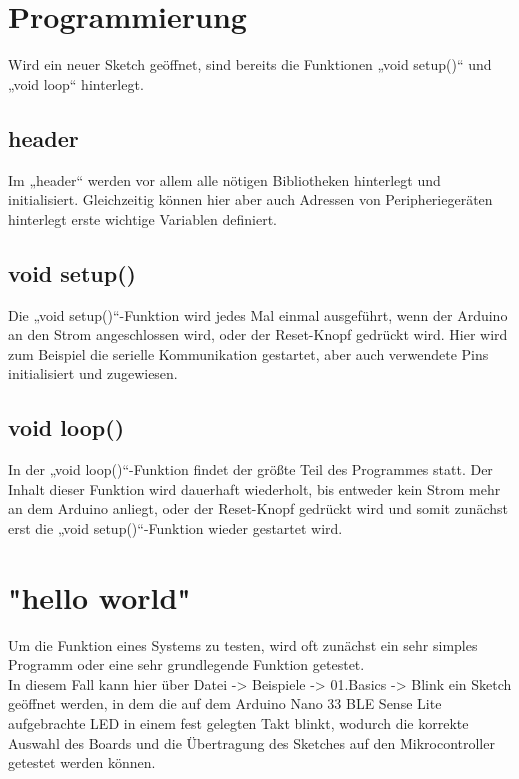 \section{Programmierung}
Wird ein neuer Sketch geöffnet, sind bereits die Funktionen „void setup()“ und „void loop“ hinterlegt.

\subsection{header}
Im „header“ werden vor allem alle nötigen Bibliotheken hinterlegt und initialisiert. Gleichzeitig können hier aber auch Adressen von Peripheriegeräten hinterlegt erste wichtige Variablen definiert.

\subsection{void setup()}
Die „void setup()“-Funktion wird jedes Mal einmal ausgeführt, wenn der Arduino an den Strom angeschlossen wird, oder der Reset-Knopf gedrückt wird.
Hier wird zum Beispiel die serielle Kommunikation gestartet, aber auch verwendete Pins initialisiert und zugewiesen.

\subsection{void loop()}
In der „void loop()“-Funktion findet der größte Teil des Programmes statt. Der Inhalt dieser Funktion wird dauerhaft wiederholt, bis entweder kein Strom mehr an dem Arduino anliegt, oder der Reset-Knopf gedrückt wird und somit zunächst erst die „void setup()“-Funktion wieder gestartet wird.

\section{"hello world"}
Um die Funktion eines Systems zu testen, wird oft zunächst ein sehr simples Programm oder eine sehr grundlegende Funktion getestet.\\
In diesem Fall kann hier über Datei -> Beispiele -> 01.Basics -> Blink ein Sketch geöffnet werden, in dem die auf dem Arduino Nano 33 BLE Sense Lite aufgebrachte LED in einem fest gelegten Takt blinkt, wodurch die korrekte Auswahl des Boards und die Übertragung des Sketches auf den Mikrocontroller getestet werden können. \\

%


